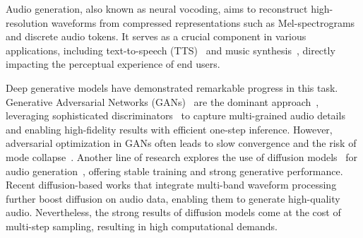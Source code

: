 Audio generation, also known as neural vocoding, aims to reconstruct high-resolution waveforms from compressed representations such as Mel-spectrograms and discrete audio tokens. It serves as a crucial component in various applications, including text-to-speech (TTS)~\citep{neural_tts,vits,zipvoice} and music synthesis~\citep{neural_audio_synth,adversarial_audio_synth,gansynth}, directly impacting the perceptual experience of end users.

Deep generative models have demonstrated remarkable progress in this task. 
Generative Adversarial Networks (GANs)~\citep{gan,wgan} are the dominant approach~\citep{melgan,hifigan,bigvgan,vocos}, leveraging sophisticated discriminators~\citep{melgan, hifigan,mrd,multi-subband-gan} to capture multi-grained audio details and enabling high-fidelity results with efficient one-step inference. However, adversarial optimization in GANs often leads to slow convergence and the risk of mode collapse~\citep{gan_collapse}. Another line of research explores the use of diffusion models~\citep{difussion_2015,ddpm,ddim} for audio generation~\citep{diffwave,Wavegrad,priorgrad,fregrad}, offering stable training and strong generative performance. 
Recent diffusion-based works that integrate multi-band waveform processing~\citep{mbd, rfwave} further boost diffusion on audio data, enabling them to generate high-quality audio.
Nevertheless, the strong results of diffusion models come at the cost of multi-step sampling, resulting in high computational demands. 

